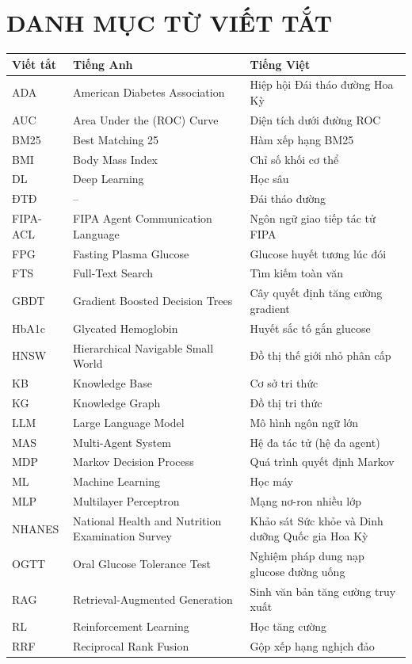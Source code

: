 \chapter*{DANH MỤC TỪ VIẾT TẮT}
\begin{spacing}{1.1}
\small
\begin{longtable}{@{}L{2.3cm}L{6.3cm}L{6.0cm}@{}}
\toprule
\textbf{Viết tắt} & \textbf{Tiếng Anh} & \textbf{Tiếng Việt} \\
\midrule
\endhead
ADA & American Diabetes Association & Hiệp hội Đái tháo đường Hoa Kỳ \\
AUC & Area Under the (ROC) Curve & Diện tích dưới đường ROC \\
BM25 & Best Matching 25 & Hàm xếp hạng BM25 \\
BMI & Body Mass Index & Chỉ số khối cơ thể \\
DL & Deep Learning & Học sâu \\
ĐTĐ & -- & Đái tháo đường \\
FIPA-ACL & FIPA Agent Communication Language & Ngôn ngữ giao tiếp tác tử FIPA \\
FPG & Fasting Plasma Glucose & Glucose huyết tương lúc đói \\
FTS & Full-Text Search & Tìm kiếm toàn văn \\
GBDT & Gradient Boosted Decision Trees & Cây quyết định tăng cường gradient \\
HbA1c & Glycated Hemoglobin & Huyết sắc tố gắn glucose \\
HNSW & Hierarchical Navigable Small World & Đồ thị thế giới nhỏ phân cấp \\
KB & Knowledge Base & Cơ sở tri thức \\
KG & Knowledge Graph & Đồ thị tri thức \\
LLM & Large Language Model & Mô hình ngôn ngữ lớn \\
MAS & Multi-Agent System & Hệ đa tác tử (hệ đa agent) \\
MDP & Markov Decision Process & Quá trình quyết định Markov \\
ML & Machine Learning & Học máy \\
MLP & Multilayer Perceptron & Mạng nơ-ron nhiều lớp \\
NHANES & National Health and Nutrition Examination Survey & Khảo sát Sức khỏe và Dinh dưỡng Quốc gia Hoa Kỳ \\
OGTT & Oral Glucose Tolerance Test & Nghiệm pháp dung nạp glucose đường uống \\
RAG & Retrieval-Augmented Generation & Sinh văn bản tăng cường truy xuất \\
RL & Reinforcement Learning & Học tăng cường \\
RRF & Reciprocal Rank Fusion & Gộp xếp hạng nghịch đảo \\
\bottomrule
\end{longtable}
\end{spacing}

